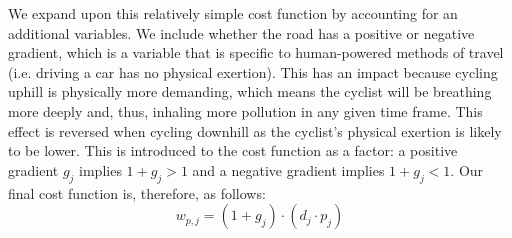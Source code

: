 \documentclass[11pt,twosided,a4paper]{report}
\begin{document}
We expand upon this relatively simple cost function by accounting for an additional variables. We include whether the road has a positive or negative gradient, which is a variable that is specific to human-powered methods of travel (i.e. driving a car has no physical exertion). This has an impact because cycling uphill is physically more demanding, which means the cyclist will be breathing more deeply and, thus, inhaling more pollution in any given time frame. This effect is reversed when cycling downhill as the cyclist's physical exertion is likely to be lower. This is introduced to the cost function as a factor: a positive gradient $g_j$ implies $1 + g_j > 1$ and a negative gradient implies $1 + g_j < 1$. Our final cost function is, therefore, as follows:%
\begin{equation}
w_{p, j} = (1 + g_j) \cdot (d_j \cdot p_j)
\end{equation}

\end{document}
